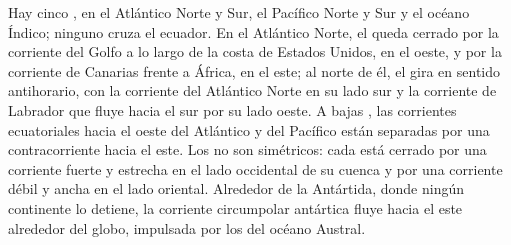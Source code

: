 Hay cinco , en el Atlántico Norte y Sur, el Pacífico Norte y Sur y el océano Índico; ninguno cruza el ecuador. En el Atlántico Norte, el  queda cerrado por la corriente del Golfo a lo largo de la costa de Estados Unidos, en el oeste, y por la corriente de Canarias frente a África, en el este; al norte de él, el  gira en sentido antihorario, con la corriente del Atlántico Norte en su lado sur y la corriente de Labrador que fluye hacia el sur por su lado oeste. A bajas , las corrientes ecuatoriales hacia el oeste del Atlántico y del Pacífico están separadas por una contracorriente hacia el este. Los  no son simétricos: cada  está cerrado por una corriente fuerte y estrecha en el lado occidental de su cuenca y por una corriente débil y ancha en el lado oriental. Alrededor de la Antártida, donde ningún continente lo detiene, la corriente circumpolar antártica fluye hacia el este alrededor del globo, impulsada por los  del océano Austral.

